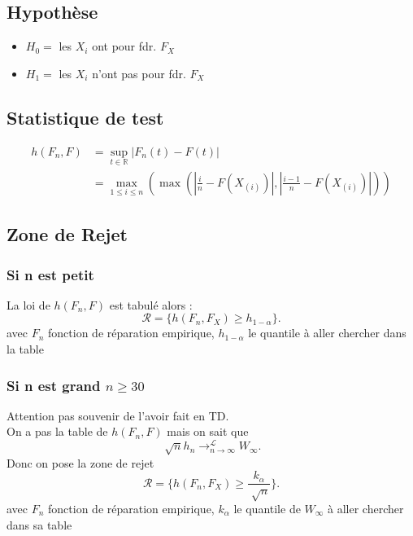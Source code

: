 \documentclass{article}
\theoremstyle{plain}%
\theoremstyle{definition}
\theoremstyle{remark}
\begin{document}
\subsection*{Hypothèse}
\begin{itemize}
    \item $ H_0 = $ les $ X_i $ ont pour fdr. $ F_X $ 
    \item $ H_1 = $ les $ X_i $ n'ont pas pour fdr. $ F_X $ 
\end{itemize}

\subsection*{Statistique de test} 
\begin{align*}
    h(F_n, F) &= \sup _{t \in \mathbb{R}} \left| F_n(t) - F(t) \right| \\
        &= \max _{1 \leq i \leq n} ( \max ( \left| \frac{i}{n} - F(X_{(i)}) \right| , \left| \frac{i-1}{n}- F(X_{(i)}) \right|  ))
\end{align*}    

\subsection*{Zone de Rejet}
\subsubsection*{Si n est petit}
La loi de $ h(F_n, F) $ est tabulé alors :
\[
    \mathcal{R} = \{h(F_n, F_X) \geq h_{1-\alpha }\}
.\]
avec $ F_n $ fonction de réparation empirique, $ h_{1 -\alpha } $ le quantile à aller chercher dans la table 

\subsubsection*{Si n est grand $ n \geq 30 $ }
Attention pas souvenir de l'avoir fait en TD. \\
On a pas la table de $ h(F_n, F) $ mais on sait que 
\[
    \sqrt[]{n}h_n \to ^{\mathcal{L}}_{n \to \infty } W_{\infty }
.\]
Donc on pose la zone de rejet 
\[
    \mathcal{R} = \{h(F_n, F_X) \geq \frac{k_\alpha }{\sqrt[]{n}} \}
.\]
avec $ F_n $ fonction de réparation empirique, $ k_{\alpha } $ le quantile de $ W_\infty  $ à aller chercher dans sa table 
\end{document}
